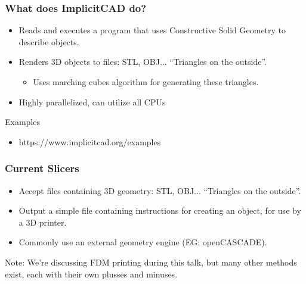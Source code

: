 \documentclass[hyperref={pdfpagemode=FullScreen},aspectratio=169]{beamer}
\begin{document}
\begin{frame}
  \frametitle{What does ImplicitCAD do?}
  \begin{itemize}
  \item Reads and executes a program that uses Constructive Solid Geometry to describe objects.
  \item Renders 3D objects to files: STL, OBJ... ``Triangles on the outside''.
    \begin{itemize}
    \item Uses marching cubes algorithm for generating these triangles.
    \end{itemize}
  \item Highly parallelized, can utilize all CPUs
  \end{itemize}
  \begin{block}{Examples}
    \begin{itemize}
    \item https://www.implicitcad.org/examples
    \end{itemize}
  \end{block}
\end{frame}

\begin{frame}
  \frametitle{Current Slicers}
  \begin{itemize}
  \item Accept files containing 3D geometry: STL, OBJ... ``Triangles on the outside''.
  \item Output a simple file containing instructions for creating an object, for use by a 3D printer.
  \item Commonly use an external geometry engine (EG: openCASCADE).
  \end{itemize}
  Note: We're discussing FDM printing during this talk, but many other methods exist, each with their own plusses and minuses.
\end{frame}
\end{document}
